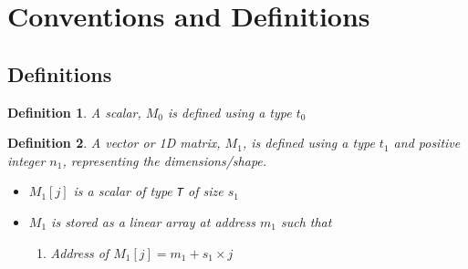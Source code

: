 \documentclass[letterpaper,12pt]{article}
\begin{document}
\newcommand{\TBC}{}

\newtheorem{definition}{Definition}


\newcommand{\KV}{\mathtt{KV}}

\newcommand{\nHKV}{{n_H}_{\KV}}
\newcommand{\nDKV}{{n_D}_{\KV}}
\newcommand{\tet}{\mathtt{tet}}
\newcommand{\KC}{\mathtt{KC}}

\newcommand{\xb}{\mathtt{xb}}

\newcommand{\wq}{\mathtt{wq}}
\newcommand{\wk}{\mathtt{wk}}
\newcommand{\wv}{\mathtt{wv}}

\newcommand{\wrms}{\mathtt{wrms}}

\newcommand{\rmsnorm}{\mathtt{rmsnorm}}
\newcommand{\vecmatmul}{\mathtt{vecmatmul}}

\section{Conventions and Definitions}
\subsection{Definitions}

\begin{definition}
  \label{scalar}
  A scalar, \(M_0\) is defined using a type \(t_0\)
\end{definition}

\begin{definition}
  \label{1D_matrix}
  A vector or 1D matrix, \(M_1\), is defined using a type \(t_1\) and positive integer
\(n_1\), representing the dimensions/shape.
\begin{itemize}
  \item \(M_1[j]\) is a scalar of type {\tt T} of size \(s_1\)
\item \(M_1\) is stored as a linear array at address \(m_1\)
  such that 
    \begin{enumerate} 
\item Address of \(M_1[j]  = m_1 + s_1 \times j\)
\end{enumerate}
\end{itemize}
\end{definition}
\end{document}

